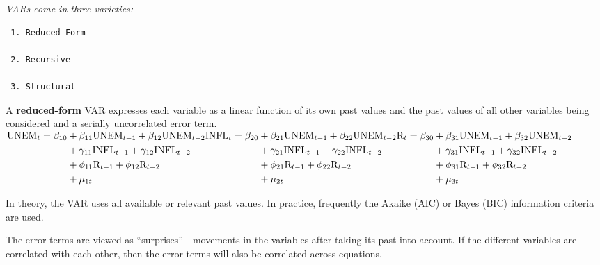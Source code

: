 \documentclass[
  ignorenonframetext,
]{beamer}
\begin{document}
\begin{frame}[fragile]
\emph{VARs come in three varieties:}

\begin{verbatim}
 1. Reduced Form 

 2. Recursive 

 3. Structural 
\end{verbatim}

A \textbf{reduced-form} VAR expresses each variable as a linear function
of its own past values and the past values of all other variables being
considered and a serially uncorrelated error term.
\(\begin{aligned}\text{UNEM}_t = \beta_{10} &+ \beta_{11}\text{UNEM}_{t-1} + \beta_{12}\text{UNEM}_{t-2}\\&+ \gamma_{11}\text{INFL}_{t-1} + \gamma_{12}\text{INFL}_{t-2} \\&+ \phi_{11}\text{R}_{t-1} + \phi_{12}\text{R}_{t-2} \\&+ \mu_{1t}\end{aligned}\\ \ \\ \begin{aligned}\text{INFL}_t = \beta_{20} &+ \beta_{21}\text{UNEM}_{t-1} + \beta_{22}\text{UNEM}_{t-2}\\ &+ \gamma_{21}\text{INFL}_{t-1} + \gamma_{22}\text{INFL}_{t-2} \\&+ \phi_{21}\text{R}_{t-1} + \phi_{22}\text{R}_{t-2} \\&+ \mu_{2t}\end{aligned}\\ \ \\ \begin{aligned}\text{R}_t = \beta_{30} &+ \beta_{31}\text{UNEM}_{t-1} + \beta_{32}\text{UNEM}_{t-2}\\ &+ \gamma_{31}\text{INFL}_{t-1} + \gamma_{32}\text{INFL}_{t-2} \\&+ \phi_{31}\text{R}_{t-1} + \phi_{32}\text{R}_{t-2} \\&+ \mu_{3t}\end{aligned}\)

In theory, the VAR uses all available or relevant past values. In
practice, frequently the Akaike (AIC) or Bayes (BIC) information
criteria are used.

The error terms are viewed as ``surprises''---movements in the variables
after taking its past into account. If the different variables are
correlated with each other, then the error terms will also be correlated
across equations.
\end{frame}
\end{document}
